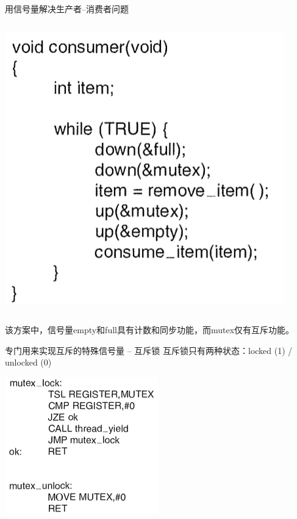 \documentclass[xcolor=svgnames]{beamer}
\begin{document}
\begin{CJK*}{UTF8}{gbsn}
\begin{frame}{用信号量解决生产者--消费者问题}
\begin{columns}[b]
\includegraphics[width=1.0\textwidth]{conssem.png}
\end{columns}%

该方案中，信号量empty和full具有计数和同步功能，而mutex仅有互斥功能。
\end{frame}

\begin{frame}{专门用来实现互斥的特殊信号量 -- 互斥锁}
互斥锁只有两种状态：locked (1) / unlocked (0)

\includegraphics[width=0.5\textwidth]{mutex.png}
\end{frame}


\end{CJK*}
\end{document}
